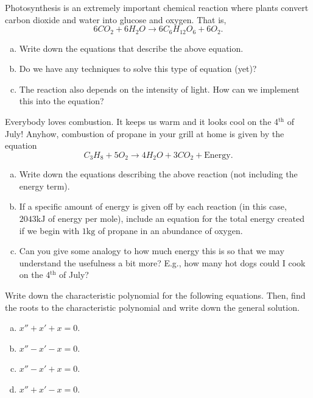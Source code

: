 \begin{problem}
    Photosynthesis is an extremely important chemical reaction where plants convert carbon dioxide and water into glucose and oxygen. That is,
    \[
        6CO_2 + 6H_2O \to 6C_6 H_{12} O_6 + 6 O_2.
    \]
    \begin{enumerate}[(a)]
        \item Write down the equations that describe the above equation.
        \item Do we have any techniques to solve this type of equation (yet)?
        \item The reaction also depends on the intensity of light.  How can we implement this into the equation?
    \end{enumerate}
\end{problem}

\begin{problem}
Everybody loves combustion. It keeps us warm and it looks cool on the 4$^\textrm{th}$ of July!  Anyhow, combustion of propane in your grill at home is given by the equation
    \[
        C_3 H_8 + 5O_2 \to 4H_2O + 3CO_2 + \textrm{Energy}.
    \]
    \begin{enumerate}[(a)]
        \item Write down the equations describing the above reaction (not including the energy term).
        \item If a specific amount of energy is given off by each reaction (in this case, $2043\textrm{kJ}$ of energy per mole), include an equation for the total energy created if we begin with $1\textrm{kg}$ of propane in an abundance of oxygen.
        \item Can you give some analogy to how much energy this is so that we may understand the usefulness a bit more? E.g., how many hot dogs could I cook on the 4$^\textrm{th}$ of July?
    \end{enumerate}

\end{problem}

\begin{problem}
Write down the characteristic polynomial for the following equations.  Then, find the roots to the characteristic polynomial and write down the general solution.
\begin{enumerate}[(a)]
    \item $x''+x'+x=0$.
    \item $x''-x'-x=0$.
    \item $x''-x'+x=0$.
    \item $x''+x'-x=0$.
\end{enumerate}
\end{problem}

